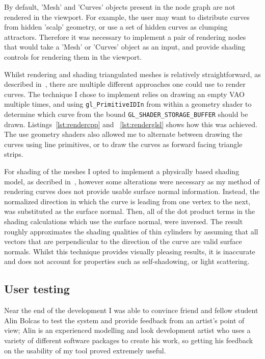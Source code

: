 \documentclass[]{acmsiggraph}
\begin{document}
By default, 'Mesh' and 'Curves' objects present in the node graph are not rendered in the viewport. For example, the user may want to distribute curves from hidden 'scalp' geometry, or use a set of hidden curves as clumping attractors. Therefore it was necessary to implement a pair of rendering nodes that would take a 'Mesh' or 'Curves' object as an input, and provide shading controls for rendering them in the viewport.

Whilst rendering and shading triangulated meshes is relatively straightforward, as described in~\cite{objLoading}, there are multiple different approaches one could use to render curves. The technique I chose to implement relies on drawing an empty VAO multiple times, and using \texttt{gl\_PrimitiveIDIn} from within a geometry shader to determine which curve from the bound \texttt{GL\_SHADER\_STORAGE\_BUFFER} should be drawn. Listings~\ref{lst:rendercpp} and ~\ref{lst:renderglsl} shows how this was achieved. The use geometry shaders also allowed me to alternate between drawing the curves using line primitives, or to draw the curves as forward facing triangle strips. %

For shading of the meshes I opted to implement a physically based shading model, as decribed in~\cite{learnPBR}, however some alterations were necessary as my method of rendering curves does not provide usable surface normal information. Instead, the normalized direction in which the curve is leading from one vertex to the next, was substituted as the surface normal. Then, all of the dot product terms in the shading calculations which use the surface normal, were inversed. The result roughly approximates the shading qualities of thin cylinders by assuming that all vectors that are perpendicular to the direction of the curve are valid surface normals. Whilst this technique provides visually pleasing results, it is inaccurate and does not account for properties such as self-shadowing, or light scattering.


\subsection{User testing} \label{sec:usertesting}
Near the end of the development I was able to convince friend and fellow student Alin Bolcas to test the system and provide feedback from an artist's point of view; Alin is an experienced modelling and look development artist who uses a variety of different software packages to create his work, so getting his feedback on the usability of my tool proved extremely useful.
\end{document}
